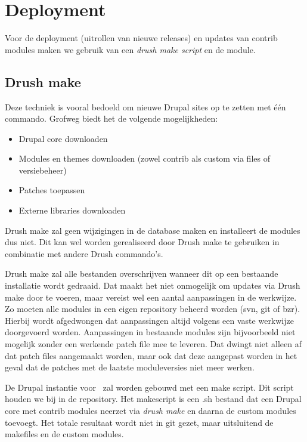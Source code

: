 \section{Deployment}\label{deployment}

Voor de deployment (uitrollen van nieuwe releases) en updates van contrib modules maken we gebruik van een \emph{drush make script} en de  module.

\subsection{Drush make}

Deze techniek is vooral bedoeld om nieuwe Drupal sites op te zetten met \'{e}\'{e}n commando. Grofweg biedt het de volgende mogelijkheden:

\begin{itemize}
  \item Drupal core downloaden
  \item Modules en themes downloaden (zowel contrib als custom via files of versiebeheer)
  \item Patches toepassen
  \item Externe libraries downloaden
\end{itemize}

Drush make zal geen wijzigingen in de database maken en installeert de modules dus niet. Dit kan wel worden gerealiseerd door Drush make te gebruiken in combinatie met andere Drush commando's.

Drush make zal alle bestanden overschrijven wanneer dit op een bestaande installatie wordt gedraaid. Dat maakt het niet onmogelijk om updates via Drush make door te voeren, maar vereist wel een aantal aanpassingen in de werkwijze. Zo moeten alle modules in een eigen repository beheerd worden (svn, git of bzr). Hierbij wordt afgedwongen dat aanpassingen altijd volgens een vaste werkwijze doorgevoerd worden. Aanpassingen in bestaande modules zijn bijvoorbeeld niet mogelijk zonder een werkende patch file mee te leveren. Dat dwingt niet alleen af dat patch files aangemaakt worden, maar ook dat deze aangepast worden in het geval dat de patches met de laatste moduleversies niet meer werken.

De Drupal instantie voor \thecustomer \ zal worden gebouwd met een make script. Dit script houden we bij in de repository. Het makescript is een .sh bestand dat een Drupal core met contrib modules neerzet via \emph{drush make} en daarna de custom modules toevoegt. Het totale resultaat wordt niet in git gezet, maar uitsluitend de makefiles en de custom modules.

